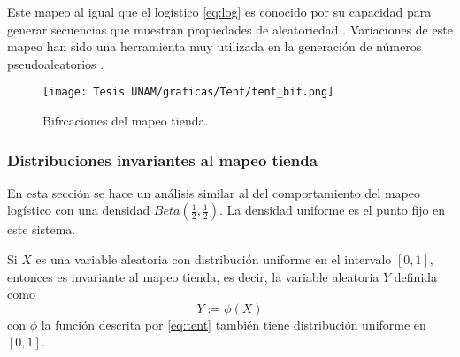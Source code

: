 \documentclass[../Main.tex]{subfiles}
\begin{document}
Este mapeo al igual que el logístico \ref{eq:log} es conocido por su capacidad para generar secuencias que muestran propiedades de aleatoriedad \cite{Schuster2005}. Variaciones de este mapeo han sido una herramienta muy utilizada en la generación de números pseudoaleatorios \cite{Callegari1997}.



\begin{figure}[h!]
    \centering
    \texttt{[image: Tesis UNAM/graficas/Tent/tent\_bif.png]}
    \caption{Bifrcaciones del mapeo tienda.}
    \label{fig:bif-log}
\end{figure} 



\subsubsection{Distribuciones invariantes al mapeo tienda}
En esta sección se hace un análisis similar al del comportamiento del mapeo logístico con una densidad $Beta(\frac{1}{2},\frac{1}{2})$. La densidad uniforme es el punto fijo en este sistema.
\begin{proposition}\label{prop:tent_unif}
Si $X$ es una variable aleatoria con distribución uniforme en el intervalo $[0,1]$, entonces es invariante al mapeo tienda, es decir, la variable aleatoria $Y$ definida como  $$Y:=\phi(X)$$ con $\phi$ la función descrita por \ref{eq:tent} también tiene distribución uniforme en $[0,1]$.
\end{proposition}
\end{document}
